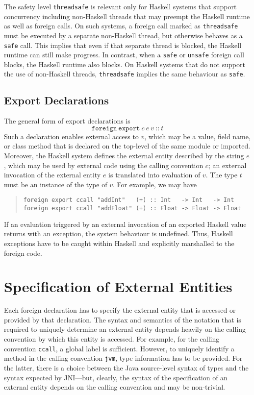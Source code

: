 \documentclass[a4paper,twoside]{article}
\newcommand{\code}[1]{\texttt{#1}}      %
\begin{document}
The safety level \code{threadsafe} is relevant only for Haskell systems that
support concurrency including non-Haskell threads that may preempt the Haskell
runtime as well as foreign calls.  On such systems, a foreign call marked as
\code{threadsafe} must be executed by a separate non-Haskell thread, but
otherwise behaves as a \code{safe} call.  This implies that even if that
separate thread is blocked, the Haskell runtime can still make progress.  In
contrast, when a \code{safe} or \code{unsafe} foreign call blocks, the Haskell
runtime also blocks.  On Haskell systems that do not support the use of
non-Haskell threads, \code{threadsafe} implies the same behaviour as
\code{safe}.

\subsection{Export Declarations}

The general form of export declarations is
%
\[
\code{foreign}~\code{export}~c~e~v~\code{{::}}~t
\]
%
Such a declaration enables external access to $v$, which may be a value, field
name, or class method that is declared on the top-level of the same module or
imported.  Moreover, the Haskell system defines the external entity described
by the string $e$, which may be used by external code using the calling
convention $c$; an external invocation of the external entity $e$ is
translated into evaluation of $v$.  The type $t$ must be an instance of the
type of $v$.  For example, we may have
%
\begin{quote}
\begin{verbatim}
foreign export ccall "addInt"   (+) :: Int   -> Int   -> Int
foreign export ccall "addFloat" (+) :: Float -> Float -> Float
\end{verbatim}
\end{quote}

If an evaluation triggered by an external invocation of an exported Haskell
value returns with an exception, the system behaviour is undefined.  Thus,
Haskell exceptions have to be caught within Haskell and explicitly marshalled
to the foreign code.


\section{Specification of External Entities}
\label{sec:extent}

Each foreign declaration has to specify the external entity that is accessed
or provided by that declaration.  The syntax and semantics of the notation
that is required to uniquely determine an external entity depends heavily on
the calling convention by which this entity is accessed.  For example, for the
calling convention \code{ccall}, a global label is sufficient.  However, to
uniquely identify a method in the calling convention \code{jvm}, type
information has to be provided.  For the latter, there is a choice between the
Java source-level syntax of types and the syntax expected by JNI---but,
clearly, the syntax of the specification of an external entity depends on the
calling convention and may be non-trivial.
\end{document}
